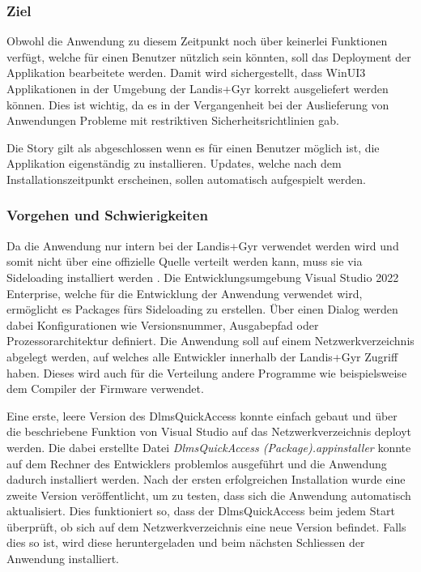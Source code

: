 \subsubsection{Ziel}
Obwohl die Anwendung zu diesem Zeitpunkt noch über keinerlei Funktionen verfügt, welche für einen Benutzer nützlich sein könnten, soll das Deployment der Applikation bearbeitete werden.
Damit wird sichergestellt, dass WinUI3 Applikationen in der Umgebung der Landis+Gyr korrekt ausgeliefert werden können.
Dies ist wichtig, da es in der Vergangenheit bei der Auslieferung von Anwendungen Probleme mit restriktiven Sicherheitsrichtlinien gab.

Die Story gilt als abgeschlossen wenn es für einen Benutzer möglich ist, die Applikation eigenständig zu installieren.
Updates, welche nach dem Installationszeitpunkt erscheinen, sollen automatisch aufgespielt werden.

\subsubsection{Vorgehen und Schwierigkeiten}
Da die Anwendung nur intern bei der Landis+Gyr verwendet werden wird und somit nicht über eine offizielle Quelle verteilt werden kann, muss sie via Sideloading installiert werden \parencite{sideload}.
Die Entwicklungsumgebung Visual Studio 2022 Enterprise, welche für die Entwicklung der Anwendung verwendet wird, ermöglicht es Packages fürs Sideloading zu erstellen.
Über einen Dialog werden dabei Konfigurationen wie Versionsnummer, Ausgabepfad oder Prozessorarchitektur definiert.
Die Anwendung soll auf einem Netzwerkverzeichnis abgelegt werden, auf welches alle Entwickler innerhalb der Landis+Gyr Zugriff haben.
Dieses wird auch für die Verteilung andere Programme wie beispielsweise dem Compiler der Firmware verwendet.

Eine erste, leere Version des DlmsQuickAccess konnte einfach gebaut und über die beschriebene Funktion von Visual Studio auf das Netzwerkverzeichnis deployt werden.
Die dabei erstellte Datei \textit{DlmsQuickAccess (Package).appinstaller} konnte auf dem Rechner des Entwicklers problemlos ausgeführt und die Anwendung dadurch installiert werden.
Nach der ersten erfolgreichen Installation wurde eine zweite Version veröffentlicht, um zu testen, dass sich die Anwendung automatisch aktualisiert.
Dies funktioniert so, dass der DlmsQuickAccess beim jedem Start überprüft, ob sich auf dem Netzwerkverzeichnis eine neue Version befindet.
Falls dies so ist, wird diese heruntergeladen und beim nächsten Schliessen der Anwendung installiert.

